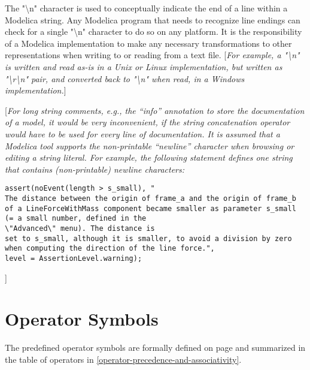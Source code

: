 The "\textbackslash{}n" character is used to conceptually indicate the
end of a line within a Modelica string. Any Modelica program that needs
to recognize line endings can check for a single "\textbackslash{}n"
character to do so on any platform. It is the responsibility of a
Modelica implementation to make any necessary transformations to other
representations when writing to or reading from a text file.
{[}\emph{For example, a "\textbackslash{}n" is written and read as-is in
a Unix or Linux implementation, but written as
"\textbackslash{}r\textbackslash{}n" pair, and converted back to
"\textbackslash{}n" when read, in a Windows implementation.}{]}

{[}\emph{For long string comments, e.g., the ``info'' annotation to
store the documentation of a model, it would be very inconvenient, if
the string concatenation operator would have to be used for every line
of documentation. It is assumed that a Modelica tool supports the
non-printable ``newline'' character when browsing or editing a string
literal. For example, the following statement defines one string that
contains (non-printable) newline characters:}

\begin{lstlisting}[language=modelica]
assert(noEvent(length > s_small), "
The distance between the origin of frame_a and the origin of frame_b
of a LineForceWithMass component became smaller as parameter s_small
(= a small number, defined in the
\"Advanced\" menu). The distance is
set to s_small, although it is smaller, to avoid a division by zero
when computing the direction of the line force.",
level = AssertionLevel.warning);
\end{lstlisting}
]
\section{Operator Symbols}

The predefined operator symbols are formally defined on page \pageref{lexical-conventions} and
summarized in the table of operators in \ref{operator-precedence-and-associativity}.
